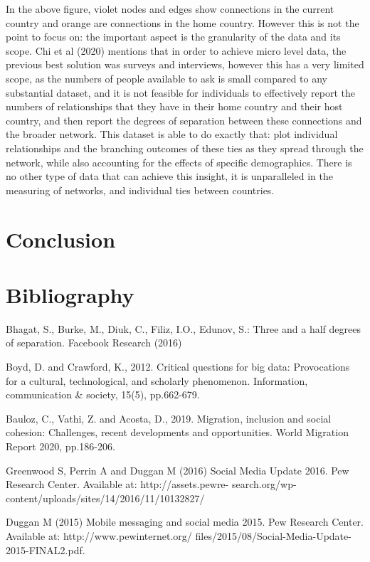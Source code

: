 \documentclass[12pt]{article}
\begin{document}
In the above figure, violet nodes and edges show connections in the current country and 
orange are connections in the home country. However this is not the point to focus on: 
the important aspect is the granularity of the data and its scope. Chi et al (2020) mentions 
that in order to achieve micro level data, the previous best solution was surveys and interviews, 
however this has a very limited scope, as the numbers of people available to ask is small 
compared to any substantial dataset, and it is not feasible for individuals to effectively 
report the numbers of relationships that they have in their home country and their host country, 
and then report the degrees of separation between these connections and the broader network. This 
dataset is able to do exactly that: plot individual relationships and the branching outcomes of  
these ties as they spread through the network, while also accounting for the effects of 
specific demographics. There is no other type of data that can achieve this insight, it is 
unparalleled in the measuring of networks, and individual ties between countries. 

\section{Conclusion}



\pagebreak 
\section{Bibliography}

Bhagat, S., Burke, M., Diuk, C., Filiz, I.O., Edunov, S.: Three and a half degrees
of separation. Facebook Research (2016)

Boyd, D. and Crawford, K., 2012. Critical questions for big data: Provocations for a cultural, technological, and scholarly phenomenon. Information, communication \& society, 15(5), pp.662-679.

Bauloz, C., Vathi, Z. and Acosta, D., 2019. Migration, inclusion and social cohesion: Challenges, recent developments and opportunities. World Migration Report 2020, pp.186-206.

Greenwood S, Perrin A and Duggan M (2016) Social Media Update
2016. Pew Research Center. Available at: http://assets.pewre-
search.org/wp-content/uploads/sites/14/2016/11/10132827/

Duggan M (2015) Mobile messaging and social media 2015. Pew
Research Center. Available at: http://www.pewinternet.org/
files/2015/08/Social-Media-Update-2015-FINAL2.pdf.
\end{document}
